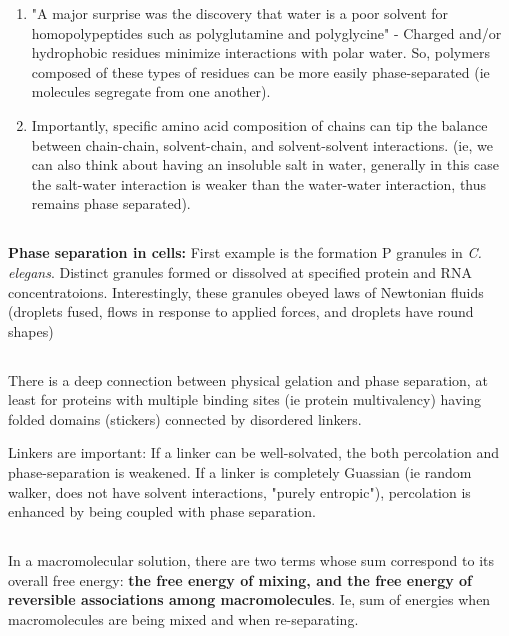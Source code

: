 \documentclass{article}
\begin{document}
\begin{enumerate}
    \item "A major surprise was the discovery that water is a poor solvent for homopolypeptides such as polyglutamine and polyglycine" - Charged and/or hydrophobic residues minimize interactions with polar water. So, polymers composed of these types of residues can be more easily phase-separated (ie molecules segregate from one another).
    \item Importantly, specific amino acid composition of chains can tip the balance between chain-chain, solvent-chain, and solvent-solvent interactions. (ie, we can also think about having an insoluble salt in water, generally in this case the salt-water interaction is weaker than the water-water interaction, thus remains phase separated).
\end{enumerate}

\subsection{}

\textbf{Phase separation in cells: } First example is the formation P granules in \textit{C. elegans}. Distinct granules formed or dissolved at specified protein and RNA concentratoions. Interestingly, these granules obeyed laws of Newtonian fluids (droplets fused, flows in response to applied forces, and droplets have round shapes)

\subsection{}

There is a deep connection between physical gelation and phase separation, at least for proteins with multiple binding sites (ie protein multivalency) having folded domains (stickers) connected by disordered linkers.

Linkers are important: If a linker can be well-solvated, the both percolation and phase-separation is weakened. If a linker is completely Guassian (ie random walker, does not have solvent interactions, "purely entropic"), percolation is enhanced by being coupled with phase separation.

\subsection{}

In a macromolecular solution, there are two terms whose sum correspond to its overall free energy: \textbf{the free energy of mixing, and the free energy of reversible associations among macromolecules}. Ie, sum of energies when macromolecules are being mixed and when re-separating.
\end{document}
